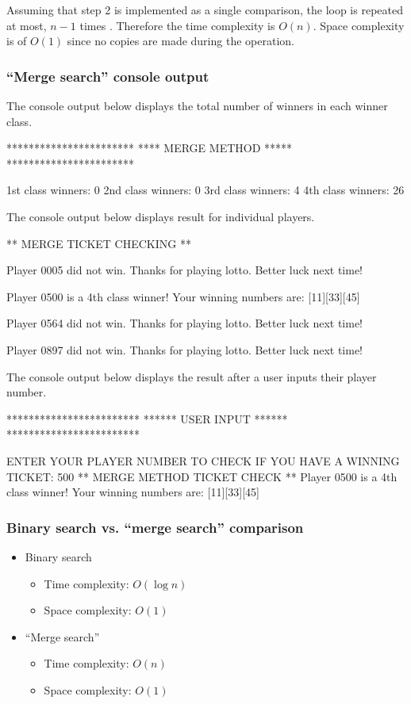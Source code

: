 Assuming that step 2 is implemented as a single comparison, the loop is repeated at most, $n - 1$ times \citep[p. 48 - 49]{Watt2001}. Therefore the time complexity is $O(n)$. Space complexity is of $O(1)$ since no copies are made during the operation.

\subsubsection{``Merge search'' console output}

The console output below displays the total number of winners in each winner class.
\\
\begin{consolecode}
***********************
**** MERGE METHOD *****
***********************

1st class winners: 0
2nd class winners: 0
3rd class winners: 4
4th class winners: 26
\end{consolecode}

\noindent
The console output below displays result for individual players.
\\
\begin{consolecode}
** MERGE TICKET CHECKING **

Player 0005 did not win. Thanks for playing lotto. 
Better luck next time!

Player 0500 is a 4th class winner!
Your winning numbers are: [11][33][45]

Player 0564 did not win. Thanks for playing lotto. 
Better luck next time!

Player 0897 did not win. Thanks for playing lotto. 
Better luck next time!
\end{consolecode}

\noindent
The console output below displays the result after a user inputs their player number.
\\
\begin{consolecode}
************************
****** USER INPUT ******
************************

ENTER YOUR PLAYER NUMBER TO CHECK IF YOU HAVE A WINNING TICKET:
500
** MERGE METHOD TICKET CHECK **
Player 0500 is a 4th class winner!
Your winning numbers are: [11][33][45]
\end{consolecode}

\newpage
\subsubsection{Binary search vs. ``merge search'' comparison}

\begin{itemize}
\item Binary search
	\begin{itemize}
	\item Time complexity: $O(\log n)$
	\item Space complexity: $O(1)$
	\end{itemize}
\item ``Merge search''
	\begin{itemize}
	\item Time complexity: $O(n)$
	\item Space complexity: $O(1)$
	\end{itemize}
\end{itemize}